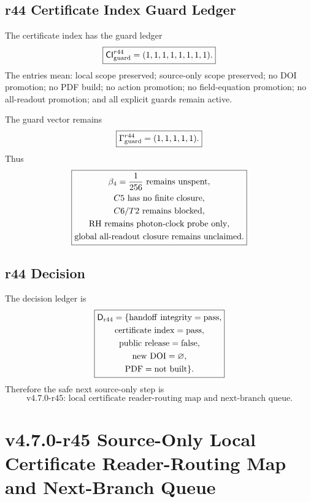 \subsection{r44 Certificate Index Guard Ledger}
\label{subsec:r44-certificate-index-guard-ledger}

The certificate index has the guard ledger
\[
\boxed{
\mathsf{CI}_{\rm guard}^{r44}
=(1,1,1,1,1,1,1,1).
}
\]
The entries mean: local scope preserved; source-only scope preserved; no DOI
promotion; no PDF build; no action promotion; no field-equation promotion; no
all-readout promotion; and all explicit guards remain active.

The guard vector remains
\[
\boxed{
\Gamma_{\rm guard}^{r44}=(1,1,1,1,1).
}
\]
Thus
\[
\boxed{
\begin{gathered}
\beta_4={1\over256}\text{ remains unspent},\\
C5\text{ has no finite closure},\\
C6/T2\text{ remains blocked},\\
\mathrm{RH}\text{ remains photon-clock probe only},\\
\text{global all-readout closure remains unclaimed}.
\end{gathered}
}
\]

\subsection{r44 Decision}
\label{subsec:r44-decision}

The decision ledger is
\[
\boxed{
\begin{gathered}
\mathsf D_{\rm r44}
=
\{
\mathrm{handoff\ integrity}=\mathrm{pass},\\
\mathrm{certificate\ index}=\mathrm{pass},\\
\mathrm{public\ release}=\mathrm{false},\\
\mathrm{new\ DOI}=\varnothing,\\
\mathrm{PDF}=\mathrm{not\ built}
\}.
\end{gathered}
}
\]
Therefore the safe next source-only step is
\[
\boxed{
\text{v4.7.0-r45: local certificate reader-routing map and next-branch queue.}
}
\]



\section{v4.7.0-r45 Source-Only Local Certificate Reader-Routing Map and Next-Branch Queue}
\label{sec:r45-reader-routing-next-branch}

